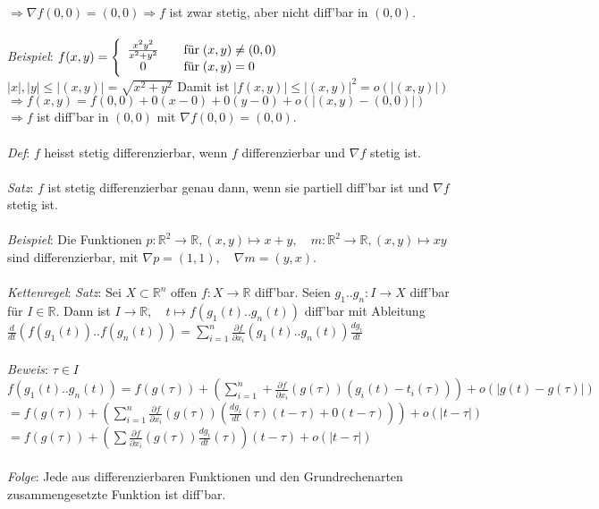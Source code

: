 \documentclass[12pt,a4paper,titlepage]{article}
\renewcommand{\d}{\partial}
\newcommand{\setR}{\mathbb{R}}
\begin{document}
$\Rightarrow \nabla f(0,0)=(0,0) \Rightarrow f$ ist zwar stetig, aber nicht diff'bar in $(0,0)$. \\
\\
\textit{Beispiel}: $f(x,y)=\left\{\begin{array}{c l}
    \frac{x^2y^2}{x^2+y^2} & \quad\text{für}\; (x,y)\neq(0,0) \\
    0 & \quad\text{für}\; (x,y)=0
  \end{array}\right.$ \\
$|x|,|y|\leq |(x,y)|=\sqrt{x^2+y^2}$ Damit ist $|f(x,y)|\leq|(x,y)|^2=o(|(x,y)|)$ \\
$\Rightarrow f(x,y)=f(0,0)+0(x-0)+0(y-0)+o(|(x,y)-(0,0)|)$ \\
$\Rightarrow f$ ist diff'bar in $(0,0)$ mit $\nabla f(0,0)=(0,0)$. \\
\\
\textit{Def}: $f$ heisst stetig differenzierbar, wenn $f$ differenzierbar und $\nabla f$ stetig ist. \\
\\
\textit{Satz}: $f$ ist stetig differenzierbar genau dann, wenn sie partiell diff'bar ist und $\nabla f$ stetig ist. \\
\\
\textit{Beispiel}: Die Funktionen $p:\setR^2\to\setR,(x,y)\mapsto x+y, \quad m:\setR^2\to\setR,(x,y)\mapsto xy$ sind differenzierbar, mit $\nabla p=(1,1),\quad \nabla m=(y,x)$. \\
\\
\textit{Kettenregel}: \textit{Satz}: Sei $X\subset\setR^n$ offen $f:X\to\setR$ diff'bar. Seien $g_1..g_n:I\to X$ diff'bar für $I\in\setR$. Dann ist $I\to\setR,\quad t\mapsto f(g_1(t)..g_n(t))$ diff'bar mit Ableitung \\
$\frac{d}{dt}(f(g_1(t))..f(g_n(t)))=\sum_{i=1}^n\frac{\d f}{\d x_i}(g_1(t)..g_n(t))\frac{dg_i}{dt}$ \\
\\
\textit{Beweis}: $\tau\in I$ \\
$f(g_1(t)..g_n(t))=f(g(\tau))+(\sum_{i=1}^n+\frac{\d f}{\d x_i}(g(\tau))(g_i(t)-t_i(\tau)))+o(|g(t)-g(\tau)|)$ \\
$=f(g(\tau))+(\sum_{i=1}^n\frac{\d f}{\d x_i}(g(\tau))(\frac{dg_i}{dt}(\tau)(t-\tau)+0(t-\tau)))+o(|t-\tau|)$ \\
$=f(g(\tau))+(\sum\frac{\d f}{\d x_i}(g(\tau))\frac{dg_i}{dt}(\tau))(t-\tau)+o(|t-\tau|)$ \\
\\
\textit{Folge}: Jede aus differenzierbaren Funktionen und den Grundrechenarten zusammengesetzte Funktion ist diff'bar.
\end{document}
